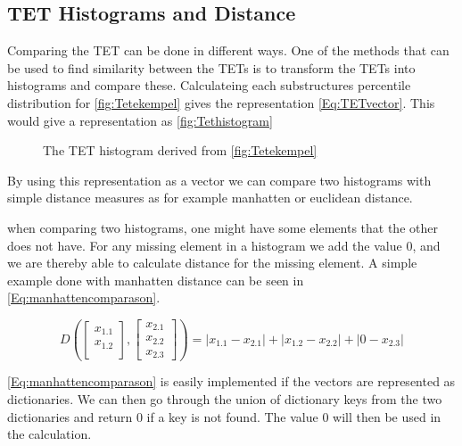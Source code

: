 \subsection{TET Histograms and Distance}
	Comparing the TET can be done in different ways. One of the methods that can be used to find similarity between the TETs is to transform the TETs into histograms and compare these\cite{JAEGER201330}. Calculateing each substructures percentile distribution for \autoref{fig:Tetekempel} gives the representation \autoref{Eq:TETvector}. This would give a representation as \autoref{fig:Tethistogram}
	
	\begin{figure}[H]
		\centering
		\begin{adjustbox}{width=0.5\textwidth}
			
		\end{adjustbox}
		\caption{The TET histogram derived from \autoref{fig:Tetekempel}}
		\label{fig:Tethistogram}
	\end{figure}
	
	By using this representation as a vector we can compare two histograms with simple distance measures as for example manhatten or euclidean distance.
	
	when comparing two histograms, one might have some elements that the other does not have. For any missing element in a histogram we add the value $0$, and we are thereby able to calculate distance for the missing element. A simple example done with manhatten distance can be seen in \autoref{Eq:manhattencomparason}\cite{singh2013k}.
	
	\begin{equation}\label{Eq:manhattencomparason}
	D(\begin{bmatrix}
	x_{1.1} \\
	x_{1.2} \\
	\end{bmatrix},
	\begin{bmatrix}
	x_{2.1} \\
	x_{2.2} \\
	x_{2.3}
	\end{bmatrix})= |x_{1.1} - x_{2.1}| + |x_{1.2} - x_{2.2}| + |0 - x_{2.3}|
	\end{equation}
	
	\autoref{Eq:manhattencomparason} is easily implemented if the vectors are represented as dictionaries. We can then go through the union of dictionary keys from the two dictionaries and return $0$ if a key is not found. The value $0$ will then be used in the calculation. 

